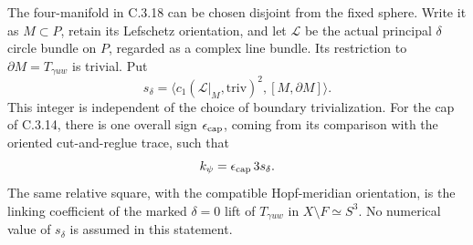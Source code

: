 \begin{proposition}
The four-manifold in C.3.18 can be chosen disjoint from the fixed
sphere. Write it as $M\subset P$, retain its Lefschetz orientation,
and let $\mathcal L$ be the actual principal $\delta$ circle bundle
on $P$, regarded as a complex line bundle. Its restriction to
$\partial M=T_{\gamma uw}$ is trivial. Put
\[
 s_\delta=\langle c_1(\mathcal L|_M,\mathrm{triv})^2,
                         [M,\partial M]\rangle.
\]
This integer is independent of the choice of boundary trivialization.
For the cap of C.3.14, there is one overall sign $\epsilon_{\rm cap}$,
coming from its comparison with the oriented cut-and-reglue trace,
such that
\[
 k_\psi=\epsilon_{\rm cap}\,3s_\delta.
\]
The same relative square, with the compatible Hopf-meridian
orientation, is the linking coefficient of the marked
$\delta=0$ lift of $T_{\gamma uw}$ in $X\setminus F\simeq S^3$.
No numerical value of $s_\delta$ is assumed in this statement.
\end{proposition}
